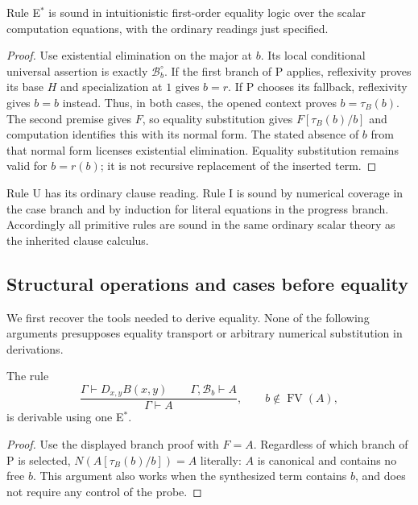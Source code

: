 \begin{lemma}
\label{lem:inferred-sound}
Rule E$^*$ is sound in intuitionistic first-order equality logic over the
scalar computation equations, with the ordinary readings just specified.
\end{lemma}
\begin{proof}
Use existential elimination on the major at $b$. Its local conditional
universal assertion is exactly $\mathcal B_b^\circ$. If the first branch
of P applies, reflexivity proves its base $H$ and specialization at $1$
gives $b=r$. If P chooses its fallback, reflexivity gives $b=b$ instead.
Thus, in both cases, the opened context proves $b=\tau_B(b)$.
The second premise gives $F$, so equality substitution gives
$F[\tau_B(b)/b]$ and computation identifies this with its normal form.
The stated absence of $b$ from that normal form licenses existential
elimination. Equality substitution remains valid for $b=r(b)$; it is not
recursive replacement of the inserted term.
\end{proof}

Rule U has its ordinary clause reading. Rule I is sound by numerical
coverage in the case branch and by induction for literal equations in the
progress branch. Accordingly all primitive rules are sound in the same
ordinary scalar theory as the inherited clause calculus.

\subsection{Structural operations and cases before equality}

We first recover the tools needed to derive equality. None of the following
arguments presupposes equality transport or arbitrary numerical substitution
in derivations.

\begin{lemma}
\label{lem:inferred-ordinary-elim}
The rule
\[
 \frac{\Gamma\vdash D_{x,y}B(x,y)\qquad
       \Gamma,\mathcal B_b\vdash A}
      {\Gamma\vdash A},\qquad b\notin\operatorname{FV}(A),
\]
is derivable using one E$^*$.
\end{lemma}
\begin{proof}
Use the displayed branch proof with $F=A$. Regardless of which branch of
P is selected, $N(A[\tau_B(b)/b])=A$ literally: $A$ is canonical and contains
no free $b$. This argument also works when the synthesized term contains
$b$, and does not require any control of the probe.
\end{proof}

